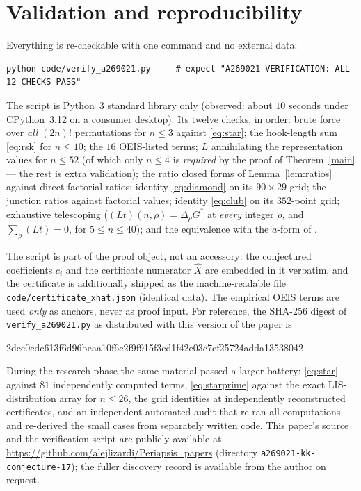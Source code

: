 \documentclass[11pt]{article}
\theoremstyle{plain}
\theoremstyle{definition}
\theoremstyle{remark}
\newcommand{\Lop}{L}
\newcommand{\Xh}{\widehat{X}}
\begin{document}
\section{Validation and reproducibility}\label{sec:repro}

Everything is re-checkable with one command and no external data:
\begin{lstlisting}
python code/verify_a269021.py     # expect "A269021 VERIFICATION: ALL 12 CHECKS PASS"
\end{lstlisting}
The script is Python~3 standard library only (observed: about $10$ seconds under CPython~3.12 on
a consumer desktop). Its twelve checks, in order:
brute force over \emph{all} $(2n)!$ permutations for $n\le3$ against \eqref{eq:star}; the
hook-length sum \eqref{eq:rsk} for $n\le10$; the $16$ OEIS-listed terms; $\Lop$ annihilating the
representation values for $n\le52$ (of which only $n\le4$ is \emph{required} by the proof of
Theorem~\ref{main} --- the rest is extra validation); the ratio closed forms of
Lemma~\ref{lem:ratios} against direct factorial ratios; identity \eqref{eq:diamond} on its
$90\times29$ grid; the junction ratios against factorial values; identity \eqref{eq:club} on its
$352$-point grid; exhaustive telescoping ($(\Lop t)(n,\rho)=\Delta_\rho G^{*}$ at \emph{every}
integer $\rho$, and $\sum_\rho(\Lop t)=0$, for $5\le n\le40$); and the equivalence with the
$\tilde a$-form of \cite{KK23}.

The script is part of the proof object, not an accessory: the conjectured coefficients $c_i$ and
the certificate numerator $\Xh$ are embedded in it verbatim, and the certificate is additionally
shipped as the machine-readable file \texttt{code/certificate\_xhat.json} (identical data). The
empirical OEIS terms are used \emph{only} as anchors, never as proof input. For reference, the
SHA-256 digest of \texttt{verify\_a269021.py} as distributed with this version of the paper is
\begin{center}\ttfamily\footnotesize 2dee0cdc613f6d96beaa10f6c2f9f915f3cd1f42e03c7cf25724adda13538042\end{center}

During the research phase the same material passed a larger battery: \eqref{eq:star} against $81$
independently computed terms, \eqref{eq:starprime} against the exact LIS-distribution array for
$n\le26$, the grid identities at independently reconstructed certificates, and an independent
automated audit that re-ran all computations and re-derived the small cases from separately
written code. This paper's source and the verification script are publicly available at
\url{https://github.com/alejlizardi/Periapsis_papers} (directory
\texttt{a269021-kk-conjecture-17}); the fuller discovery record is available from the author on
request.
\end{document}
